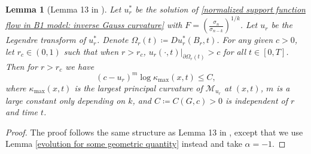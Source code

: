 \documentclass[reqno]{amsart}
\newtheorem{lemma}[theorem]{Lemma}
\theoremstyle{remark}
\theoremstyle{definition}
\numberwithin{equation}{section}
\begin{document}
\begin{lemma}[Lemma 13 in \cite{Entiresigmakcurvatureflow}]
Let $u_r^*$ be the solution of \eqref{normalized support function flow in B1 model: inverse Gauss curvature} with $F=\left(\frac{\sigma_n}{\sigma_{n-k}}\right)^{1/k}$. Let $u_r$ be the Legendre transform of $u_r^*$. Denote $\Omega_r(t) \coloneqq Du_r^*(B_r, t)$. For any given $c > 0$, let $r_c \in (0, 1)$ such that when $r > r_c$, $u_r(\cdot, t)|_{\partial\Omega_r(t)} > c$ for all $t \in [0, T]$. Then for $r > r_c$ we have
\[
(c - u_r)^m \log \kappa_{\max}(x, t) \leqslant C,
\]
where $\kappa_{\max}(x, t)$ is the largest principal curvature of $\mathcal{M}_{u_r}$ at $(x, t)$, $m$ is a large constant only depending on $k$, and $C \coloneqq C(G, c) > 0$ is independent of $r$ and time $t$.
\end{lemma}
\begin{proof}
    The proof follows the same structure as Lemma 13 in \cite{Entiresigmakcurvatureflow}, except that we use Lemma \ref{evolution for some geometric quantity} instead and take $\alpha = -1$.
\end{proof}
\end{document}
